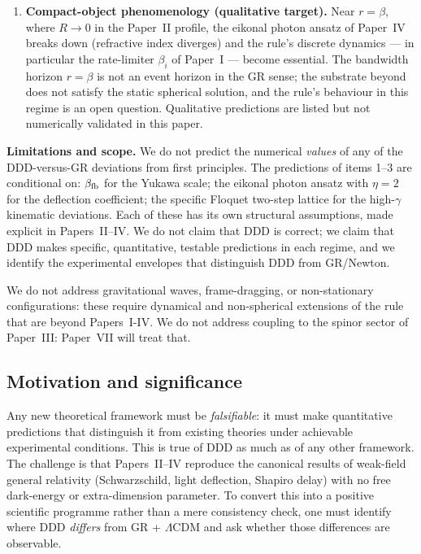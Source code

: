 \documentclass[11pt,a4paper]{article}
\begin{document}
\begin{enumerate}
\item \textbf{Compact-object phenomenology (qualitative target).}
Near $r = \beta$, where $R \to 0$ in the Paper~II profile, the eikonal
photon ansatz of Paper~IV breaks down (refractive index diverges) and
the rule's discrete dynamics --- in particular the rate-limiter
$\beta_i$ of Paper~I --- become essential. The bandwidth horizon
$r = \beta$ is not an event horizon in the GR sense; the substrate
beyond does not satisfy the static spherical solution, and the rule's
behaviour in this regime is an open question. Qualitative predictions
are listed but not numerically validated in this paper.
\end{enumerate}

\textbf{Limitations and scope.}
We do not predict the numerical \emph{values} of any of the
DDD-versus-GR deviations from first principles. The predictions of
items 1--3 are conditional on:
$\beta_{\rm fb}$ for the Yukawa scale; the eikonal photon ansatz with
$\eta = 2$ for the deflection coefficient; the specific Floquet
two-step lattice for the high-$\gamma$ kinematic deviations. Each of
these has its own structural assumptions, made explicit in
Papers~II--IV. We do not claim that DDD is correct; we claim that DDD
makes specific, quantitative, testable predictions in each regime, and
we identify the experimental envelopes that distinguish DDD from
GR/Newton.

We do not address gravitational waves, frame-dragging, or
non-stationary configurations: these require dynamical and
non-spherical extensions of the rule that are beyond Papers~I-IV. We
do not address coupling to the spinor sector of Paper~III: Paper~VII
will treat that.

\subsection*{Motivation and significance}

Any new theoretical framework must be \emph{falsifiable}: it must
make quantitative predictions that distinguish it from existing
theories under achievable experimental conditions. This is true of
DDD as much as of any other framework. The challenge is that
Papers~II--IV reproduce the canonical results of weak-field general
relativity (Schwarzschild, light deflection, Shapiro delay) with no
free dark-energy or extra-dimension parameter. To convert this into
a positive scientific programme rather than a mere consistency check,
one must identify where DDD \emph{differs} from GR + $\Lambda$CDM and
ask whether those differences are observable.
\end{document}

